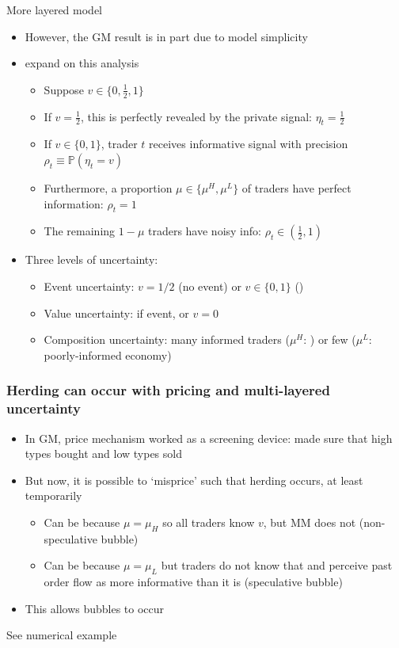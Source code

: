\documentclass[english,10pt
,aspectratio=169
]{beamer}
\begin{document}
\begin{frame}{More layered model}
	\begin{itemize}
		\item However, the GM result is in part due to model simplicity
		\item \cite{avery_multidimensional_1998} expand on this analysis
		\begin{itemize}
			\item Suppose $v \in \{0,\frac{1}{2},1\}$
			\item If $v=\frac{1}{2}$, this is perfectly revealed by the private signal: $\eta_{t}=\frac{1}{2}$
			\item If $v \in \{0,1\}$, trader $t$ receives informative signal with precision $\rho_t \equiv \mathbb{P}(\eta_{t}=v)$
			\item Furthermore, a proportion $\mu \in \{\mu^{H}, \mu^{L}\}$ of traders have perfect information: $\rho_{t}=1$
			\item The remaining $1-\mu$ traders have noisy info: $\rho_{t} \in (\frac{1}{2},1)$
		\end{itemize}
		\pause
		\item Three levels of uncertainty: 
		\begin{itemize}
			\item Event uncertainty: $v=1/2$ (\alert{no event}) or $v \in \{0,1\}$ ()
			\item Value uncertainty: if event,  or \alert{$v=0$}
			\item Composition uncertainty: many informed traders ($\mu^{H}$: ) or few ($\mu^{L}$: \alert{poorly-informed economy})
		\end{itemize}
	\end{itemize}
\end{frame}


\begin{frame}[label=az]
	\frametitle{Herding can occur with pricing and multi-layered uncertainty}
	\begin{itemize}
		\item In GM, price mechanism worked as a screening device: made sure that high types bought and low types sold
		\item But now, it is possible to `misprice' such that herding occurs, at least temporarily
		\begin{itemize}
			\item Can be because $\mu = \mu_H$ so all traders know $v$, but MM does not (non-speculative bubble)
			\item Can be because $\mu = \mu_L$ but traders do not know that and perceive past order flow as more informative than it is (speculative bubble)
		\end{itemize}
		\item This allows bubbles to occur
	\end{itemize}
	See numerical example \hyperlink{layers}{}
\end{frame}
\end{document}
